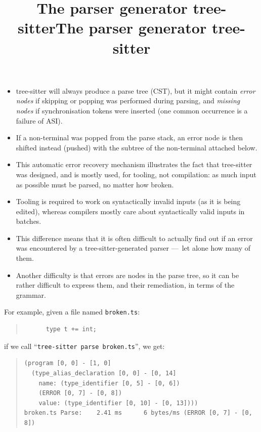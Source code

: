 \documentclass[wide]{slides}
\newcommand{\TreeSitter}[0]{\textsf{tree-sitter}}
\begin{document}
\begin{slide}
  \title{The parser generator tree-sitter}

  \begin{itemize}

    \item \TreeSitter{} will always produce a parse tree (CST), but it
      might contain \emph{error nodes} if skipping or popping was
      performed during parsing, and \emph{missing nodes} if
      synchronisation tokens were inserted (one common occurrence is a
      failure of ASI).

    \item If a non\hyp{}terminal was popped from the parse stack, an
      error node is then shifted instead (pushed) with the subtree of
      the non\hyp{}terminal attached below.

    \item This automatic error recovery mechanism illustrates the fact
      that \TreeSitter{} was designed, and is mostly used, for
      tooling, not compilation: as much input as possible must be
      parsed, no matter how broken.

    \item Tooling is required to work on syntactically invalid inputs
      (as it is being edited), whereas compilers mostly care about
      syntactically valid inputs in batches.

    \item This difference means that it is often difficult to actually
      find out if an error was encountered by a
      \TreeSitter\hyp{}generated parser ---~let alone how many of
      them.

    \item Another difficulty is that errors are nodes in the parse
      tree, so it can be rather difficult to express them, and their
      remediation, in terms of the grammar.

  \end{itemize}

\end{slide}

\begin{slide}
  \title{The parser generator tree-sitter}

  For example, given a file named \texttt{broken.ts}:
  \begin{quote}
    \begin{lstlisting}
      type t += int;
    \end{lstlisting}
  \end{quote}
  if we call ``\texttt{tree-sitter parse broken.ts}'', we get:
  \begin{quote}
    \small
\begin{verbatim}
(program [0, 0] - [1, 0]
  (type_alias_declaration [0, 0] - [0, 14]
    name: (type_identifier [0, 5] - [0, 6])
    (ERROR [0, 7] - [0, 8])
    value: (type_identifier [0, 10] - [0, 13])))
broken.ts Parse:    2.41 ms      6 bytes/ms (ERROR [0, 7] - [0, 8])
\end{verbatim}
\end{quote}

\end{slide}
\end{document}
